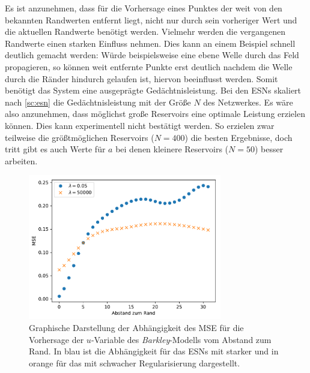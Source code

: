 Es ist anzunehmen, dass für die Vorhersage eines Punktes der weit von den bekannten Randwerten entfernt liegt, nicht nur durch sein vorheriger Wert und die aktuellen Randwerte benötigt werden. Vielmehr werden die vergangenen Randwerte einen starken Einfluss nehmen. Dies kann an einem Beispiel schnell deutlich gemacht werden: Würde beispielsweise eine ebene Welle durch das Feld propagieren, so können weit entfernte Punkte erst deutlich nachdem die Welle durch die Ränder hindurch gelaufen ist, hiervon beeinflusst werden. Somit benötigt das System eine ausgeprägte Gedächtnisleistung. Bei den \textsc{ESN}s skaliert nach \ref{sc:esn} die Gedächtnisleistung mit der Größe $N$ des Netzwerkes. Es wäre also anzunehmen, dass möglichst große Reservoirs eine optimale Leistung erzielen können. Dies kann experimentell nicht bestätigt werden. So erzielen zwar teilweise die größtmöglichen Reservoirs ($N=400$) die besten Ergebnisse, doch tritt gibt es auch Werte für $a$ bei denen kleinere Reservoirs ($N=50$) besser arbeiten.\\

\begin{figure}[h]
	\centering
	\includegraphics[height=2.5in]{figures/results/inner_cross_prediction/inner_errors.pdf}
	\setcapmargin[1cm]{0.5cm}
	\caption{Graphische Darstellung der Abhängigkeit des MSE für die Vorhersage der $u$-Variable des \textit{Barkley}-Modells vom Abstand zum Rand. In blau ist die Abhängigkeit für das \textsc{ESN}s mit starker und in orange für das mit schwacher Regularisierung dargestellt.}
	\label{fig:exp_inner_cross_barkley_esn_error_dependency_comparison}
\end{figure} 

